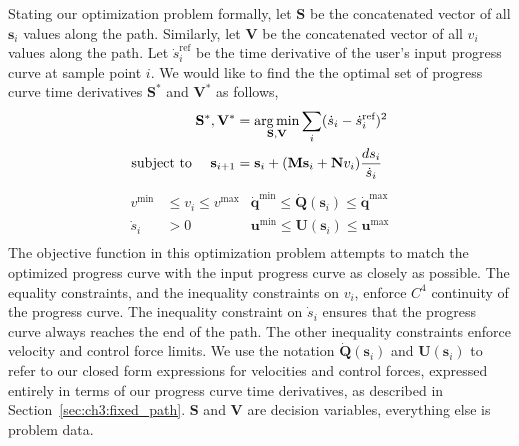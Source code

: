 Stating our optimization problem formally, let $\mathbf{S}$ be the concatenated vector of all $\mathbf{s}_i$ values along the path.
Similarly, let $\mathbf{V}$ be the concatenated vector of all $v_i$ values along the path.
Let $\dot{s}_i^{\text{ref}}$ be the  time derivative of the user's input progress curve at sample point $i$.
We would like to find the the optimal set of progress curve time derivatives $\mathbf{S}^*$ and $\mathbf{V}^*$ as follows, 
%
\begin{equation*}
\begin{aligned}
\mathbf{S}^{*},\mathbf{V}^{*} & = \operatorname*{arg\,min}_{\mathbf{S},\mathbf{V}} \sum_{i} ( \dot{s}_i - \dot{s}_i^{\text{ref}} )^{2} \\
\text{subject to~~~~}
\mathbf{s}_{i+1}              & =    \mathbf{s}_{i} + (\mathbf{M}\mathbf{s}_{i} + \mathbf{N}v_{i}) \frac{ds_i}{\dot{s}_i} \\
\end{aligned}
\end{equation*}
%
\vspace{-5pt}
\begin{equation}
\begin{aligned}
v^{\text{min}}  & \leq v_i \leq v^{\text{max}} & \dot{\mathbf{q}}^{\text{min}}  \leq \dot{\mathbf{Q}}(\mathbf{s}_i) \leq \dot{\mathbf{q}}^{\text{max}} \\
\dot{s}_i       & > 0                          & \mathbf{u}^{\text{min}}          \leq \mathbf{U}(\mathbf{s}_i)       \leq \mathbf{u}^{\text{max}} \\
\end{aligned}
\label{eqn:ch3:s_star_v_star}
\end{equation}
%
The objective function in this optimization problem attempts to match the optimized progress curve with the input progress curve as closely as possible.
The equality constraints, and the inequality constraints on $v_i$, enforce $C^4$ continuity of the progress curve.
The inequality constraint on $\dot{s}_i$ ensures that the progress curve always reaches the end of the path.
The other inequality constraints enforce velocity and control force limits.
We use the notation $\dot{\mathbf{Q}}(\mathbf{s}_i)$ and $\mathbf{U}(\mathbf{s}_i)$ to refer to our closed form expressions for velocities and control forces, expressed entirely in terms of our progress curve time derivatives, as described in Section~\ref{sec:ch3:fixed_path}.
$\mathbf{S}$ and $\mathbf{V}$ are decision variables, everything else is problem data.


